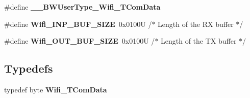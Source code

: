 \begin{DoxyCompactItemize}
\item 
\hypertarget{group___wifi__module_ga9a72bd61af9477f08d94483386c022a2}{\#define {\bfseries \-\_\-\-\_\-\-B\-W\-User\-Type\-\_\-\-Wifi\-\_\-\-T\-Com\-Data}}\label{group___wifi__module_ga9a72bd61af9477f08d94483386c022a2}

\item 
\hypertarget{group___wifi__module_gaa3d2de131804952fafd1263625255e40}{\#define {\bfseries Wifi\-\_\-\-I\-N\-P\-\_\-\-B\-U\-F\-\_\-\-S\-I\-Z\-E}~0x0100\-U     /$\ast$ Length of the R\-X buffer $\ast$/}\label{group___wifi__module_gaa3d2de131804952fafd1263625255e40}

\item 
\hypertarget{group___wifi__module_ga7baaa1360b0c3b79ae3637940230e93d}{\#define {\bfseries Wifi\-\_\-\-O\-U\-T\-\_\-\-B\-U\-F\-\_\-\-S\-I\-Z\-E}~0x0100\-U     /$\ast$ Length of the T\-X buffer $\ast$/}\label{group___wifi__module_ga7baaa1360b0c3b79ae3637940230e93d}

\end{DoxyCompactItemize}
\subsection*{Typedefs}
\begin{DoxyCompactItemize}
\item 
\hypertarget{group___wifi__module_ga5ed03b79844dfa84b85add518c860d2f}{typedef byte {\bfseries Wifi\-\_\-\-T\-Com\-Data}}\label{group___wifi__module_ga5ed03b79844dfa84b85add518c860d2f}

\end{DoxyCompactItemize}
